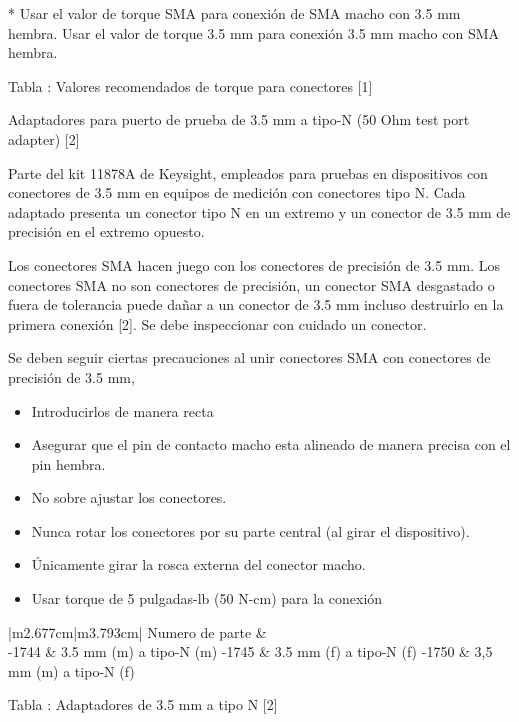 \documentclass{article}
\makeatletter
\newcommand\arraybslash{\let\\\@arraycr}
\newcounter{Table}
\renewcommand\theTable{\arabic{Table}}
\makeatother
\begin{document}
	* Usar el valor de torque SMA para conexión de SMA macho con 3.5 mm hembra. Usar el valor de torque 3.5 mm para conexión
	3.5 mm macho con SMA hembra.
	
	Tabla \stepcounter{Table}{\theTable}: Valores recomendados de torque para conectores [1]
	
	Adaptadores para puerto de prueba de 3.5 mm a tipo-N (50 Ohm test port adapter) [2]
	
	Parte del kit 11878A de Keysight, empleados para pruebas en dispositivos con conectores de 3.5 mm en equipos de medición
	con conectores tipo N. Cada adaptado presenta un conector tipo N en un extremo y un conector de 3.5 mm de precisión en
	el extremo opuesto.
	
	Los conectores SMA hacen juego con los conectores de precisión de 3.5 mm. Los conectores SMA no son conectores de
	precisión, un conector SMA desgastado o fuera de tolerancia puede dañar a un conector de 3.5 mm incluso destruirlo en
	la primera conexión [2]. Se debe inspeccionar con cuidado un conector.
	
	Se deben seguir ciertas precauciones al unir conectores SMA con conectores de precisión de 3.5 mm,
	
	\begin{itemize}
		\item Introducirlos de manera recta
		\item Asegurar que el pin de contacto macho esta alineado de manera precisa con el pin hembra.
		\item No sobre ajustar los conectores.
		\item Nunca rotar los conectores por su parte central (al girar el dispositivo).
		\item Únicamente girar la rosca externa del conector macho.
		\item Usar torque de 5 pulgadas-lb (50 N-cm) para la conexión
	\end{itemize}
	
	\begin{center}
		\tablefirsthead{}
		\tablehead{}
		\tabletail{}
		\tablelasttail{}
		\begin{supertabular}{|m{2.677cm}|m{3.793cm}|}
			\hline
			\centering Numero de parte &
			~
			\\\hline
			-1744 &
			\centering\arraybslash 3.5 mm (m) a tipo-N (m)\\\hline
			-1745 &
			\centering\arraybslash 3.5 mm (f) a tipo-N (f)\\\hline
			-1750 &
			\centering\arraybslash 3,5 mm (m) a tipo-N (f)\\\hline
		\end{supertabular}
	\end{center}
	Tabla \stepcounter{Table}{\theTable}: Adaptadores de 3.5 mm a tipo N [2]	
	
\end{document}
